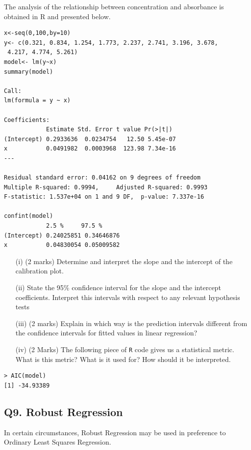 \documentclass[a4paper,12pt]{article}
\begin{document}
The analysis of the relationship between concentration and absorbance is obtained in R and presented below. 
\begin{framed}
\begin{verbatim}
x<-seq(0,100,by=10)
y<- c(0.321, 0.834, 1.254, 1.773, 2.237, 2.741, 3.196, 3.678, 
 4.217, 4.774, 5.261)
model<- lm(y~x)
summary(model)

Call:
lm(formula = y ~ x)

Coefficients:
            Estimate Std. Error t value Pr(>|t|)    
(Intercept) 0.2933636  0.0234754   12.50 5.45e-07 
x           0.0491982  0.0003968  123.98 7.34e-16 
---

Residual standard error: 0.04162 on 9 degrees of freedom
Multiple R-squared: 0.9994,     Adjusted R-squared: 0.9993 
F-statistic: 1.537e+04 on 1 and 9 DF,  p-value: 7.337e-16 

confint(model)
            2.5 %     97.5 %
(Intercept) 0.24025851 0.34646876
x           0.04830054 0.05009582

\end{verbatim}
\end{framed}

\begin{itemize}
\item[(i)] (2 marks)
Determine and interpret the slope and the intercept of the calibration plot.
\item[(ii)] State the 95\% confidence interval for the slope and the intercept coefficients. Interpret this intervals with respect to any relevant hypothesis tests
\item[(iii)] (2 marks) Explain in which way is the prediction intervals different from the confidence intervals for fitted values in linear regression?
\item[(iv)] (2 Marks) The following piece of \texttt{R} code gives us a statistical metric. What is this metric? What is it used for? How should it be interpreted.

\end{itemize}
\begin{framed}
	\begin{verbatim}
> AIC(model)
[1] -34.93389	
\end{verbatim}
\end{framed}
\subsection*{Q9. Robust Regression}

In certain circumstances, Robust Regression may be used in preference to Ordinary Least Squares Regression. 
\end{document}
